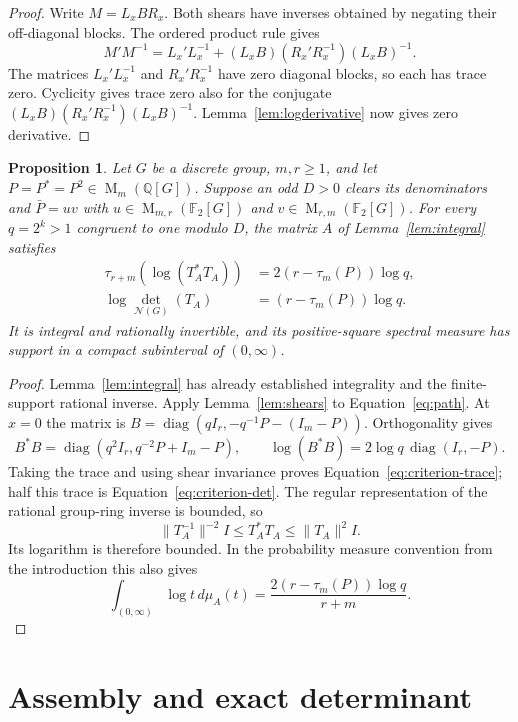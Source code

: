 \documentclass[11pt]{article}
\newtheorem{proposition}[theorem]{Proposition}
\theoremstyle{remark}
\numberwithin{equation}{section}
\newcommand{\F}{\mathbb F}
\newcommand{\Q}{\mathbb Q}
\newcommand{\Mat}{\operatorname{M}}
\newcommand{\diag}{\operatorname{diag}}
\newcommand{\N}{\mathcal N}
\begin{document}
\begin{proof}
Write $M=L_xBR_x$. Both shears have inverses obtained by negating
their off-diagonal blocks. The ordered product rule gives
\[
 M'M^{-1}=L_x'L_x^{-1}
 +(L_xB)(R_x'R_x^{-1})(L_xB)^{-1}.
\]
The matrices $L_x'L_x^{-1}$ and $R_x'R_x^{-1}$ have zero diagonal
blocks, so each has trace zero. Cyclicity gives trace zero also for
the conjugate $(L_xB)(R_x'R_x^{-1})(L_xB)^{-1}$.
Lemma~\ref{lem:logderivative} now gives zero derivative.
\end{proof}

\begin{proposition}\label{prop:criterion}
Let $G$ be a discrete group, $m,r\ge1$, and let
$P=P^*=P^2\in\Mat_m(\Q[G])$. Suppose an odd $D>0$ clears its
denominators and $\bar P=uv$ with
$u\in\Mat_{m,r}(\F_2[G])$ and
$v\in\Mat_{r,m}(\F_2[G])$. For every $q=2^k>1$ congruent to one
modulo $D$, the matrix $A$ of Lemma~\ref{lem:integral} satisfies
\begin{align}
 \tau_{r+m}(\log(T_A^*T_A))
   &=2(r-\tau_m(P))\log q,\label{eq:criterion-trace}\\
 \log\det_{\N(G)}(T_A)&=(r-\tau_m(P))\log q.
 \label{eq:criterion-det}
\end{align}
It is integral and rationally invertible, and its positive-square
spectral measure has support in a compact subinterval of $(0,\infty)$.
\end{proposition}

\begin{proof}
Lemma~\ref{lem:integral} has already established integrality and
the finite-support rational inverse. Apply Lemma~\ref{lem:shears}
to Equation~\eqref{eq:path}. At $x=0$ the matrix is
$B=\diag(qI_r,-q^{-1}P-(I_m-P))$. Orthogonality gives
\[
 B^*B=\diag(q^2I_r,q^{-2}P+I_m-P),\qquad
 \log(B^*B)=2\log q\,\diag(I_r,-P).
\]
Taking the trace and using shear invariance proves
Equation~\eqref{eq:criterion-trace}; half this trace is
Equation~\eqref{eq:criterion-det}. The regular representation
of the rational group-ring inverse is bounded, so
\[
 \|T_A^{-1}\|^{-2}I\le T_A^*T_A\le\|T_A\|^2I.
\]
Its logarithm is therefore bounded. In the probability measure
convention from the introduction this also gives
\begin{equation}\label{eq:criterion-integral}
 \int_{(0,\infty)}\log t\,d\mu_A(t)
 =\frac{2(r-\tau_m(P))\log q}{r+m}.
\end{equation}
\end{proof}

\section{Assembly and exact determinant}
\label{sec:assembly}
\end{document}
